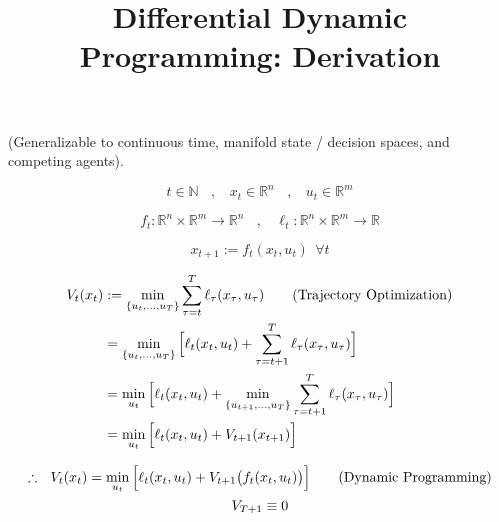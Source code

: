 \documentclass{article}
\begin{document}

\title{\vspace{-5ex}\textbf{Differential Dynamic Programming:} Derivation}
\author{\vspace{-10ex}}
\date{\vspace{-10ex}}
\maketitle


\begin{center}
(Generalizable to continuous time, manifold state / decision spaces, and competing agents).
\end{center}

\begin{equation*}
t \in \mathbb{N}\ \ \ \ ,\ \ \ \ x_t \in \mathbb{R}^n\ \ \ \ ,\ \ \ \ u_t \in \mathbb{R}^m
\end{equation*}

\begin{equation*}
f_t : \mathbb{R}^n \times \mathbb{R}^m \to \mathbb{R}^n\ \ \ \ ,\ \ \ \ \ell_t : \mathbb{R}^n \times \mathbb{R}^m \to \mathbb{R}
\end{equation*}

\begin{equation*}
x_{t+1} := f_t(x_t,u_t)\ \ \forall t \tag{Markov Decision Process}
\end{equation*}

\begin{align*}
V_t(x_t) &:= \min_{\{u_t,\ldots,u_T\}} \sum_{\tau = t}^T \ell_\tau(x_\tau,u_\tau) \tag{Trajectory Optimization}\\
&= \min_{\{u_t,\ldots,u_T\}} \Big{[}\ell_t(x_t,u_t) + \sum_{\tau = t+1}^T \ell_\tau(x_\tau,u_\tau)\Big{]}\\
&= \min_{u_t} \Big{[}\ell_t(x_t,u_t) + \min_{\{u_{t+1},\ldots,u_T\}} \sum_{\tau = t+1}^T \ell_\tau(x_\tau,u_\tau)\Big{]}\\
&= \min_{u_t} \Big{[}\ell_t(x_t,u_t) + V_{t+1}(x_{t+1})\Big{]}
\end{align*}

\begin{gather*}
\therefore\ \ V_t(x_t) = \min_{u_t} \Big{[}\ell_t(x_t,u_t) + V_{t+1}\big{(}f_t(x_t,u_t)\big{)}\Big{]} \tag{Dynamic Programming}\\
V_{T+1} \equiv 0
\end{gather*}
\end{document}
